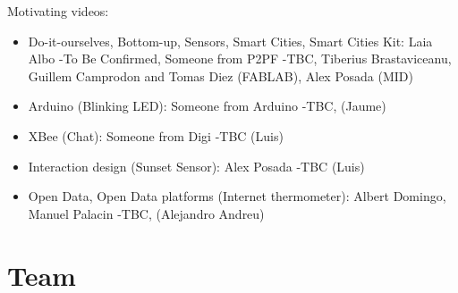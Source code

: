 \documentclass[oneside]{book}   %
\begin{document}
Motivating videos:
\begin{itemize}
\item Do-it-ourselves, Bottom-up, Sensors, Smart Cities, Smart Cities Kit:
Laia Albo -To Be Confirmed, Someone from P2PF -TBC, Tiberius Brastaviceanu, Guillem Camprodon and Tomas Diez (FABLAB), Alex Posada (MID)

\item Arduino (Blinking LED):
Someone from Arduino -TBC, (Jaume)

\item XBee (Chat):
Someone from Digi -TBC (Luis)

\item Interaction design (Sunset Sensor):
Alex Posada -TBC (Luis)

\item Open Data, Open Data platforms (Internet thermometer):
Albert Domingo, Manuel Palacin -TBC, (Alejandro Andreu)
\end{itemize}



\chapter{Team}
\end{document}
